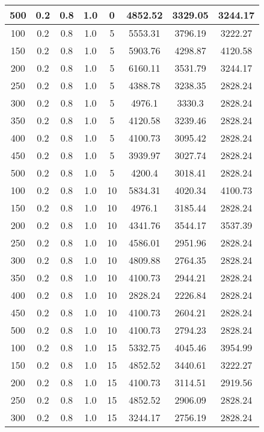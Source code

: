\documentclass[a4paper, 12pt]{extreport}
\begin{document}
\begin{itemize}
\begin{longtable}{|c|c|c|c|c|c|c|c|}
			500 & 0.2 & 0.8 & 1.0 & 0 & 4852.52 & 3329.05 & 3244.17 \\\hline
			100 & 0.2 & 0.8 & 1.0 & 5 & 5553.31 & 3796.19 & 3222.27 \\\hline
			150 & 0.2 & 0.8 & 1.0 & 5 & 5903.76 & 4298.87 & 4120.58 \\\hline
			200 & 0.2 & 0.8 & 1.0 & 5 & 6160.11 & 3531.79 & 3244.17 \\\hline
			250 & 0.2 & 0.8 & 1.0 & 5 & 4388.78 & 3238.35 & 2828.24 \\\hline
			300 & 0.2 & 0.8 & 1.0 & 5 & 4976.1 & 3330.3 & 2828.24 \\\hline
			350 & 0.2 & 0.8 & 1.0 & 5 & 4120.58 & 3239.46 & 2828.24 \\\hline
			400 & 0.2 & 0.8 & 1.0 & 5 & 4100.73 & 3095.42 & 2828.24 \\\hline
			450 & 0.2 & 0.8 & 1.0 & 5 & 3939.97 & 3027.74 & 2828.24 \\\hline
			500 & 0.2 & 0.8 & 1.0 & 5 & 4200.4 & 3018.41 & 2828.24 \\\hline
			100 & 0.2 & 0.8 & 1.0 & 10 & 5834.31 & 4020.34 & 4100.73 \\\hline
			150 & 0.2 & 0.8 & 1.0 & 10 & 4976.1 & 3185.44 & 2828.24 \\\hline
			200 & 0.2 & 0.8 & 1.0 & 10 & 4341.76 & 3544.17 & 3537.39 \\\hline
			250 & 0.2 & 0.8 & 1.0 & 10 & 4586.01 & 2951.96 & 2828.24 \\\hline
			300 & 0.2 & 0.8 & 1.0 & 10 & 4809.88 & 2764.35 & 2828.24 \\\hline
			350 & 0.2 & 0.8 & 1.0 & 10 & 4100.73 & 2944.21 & 2828.24 \\\hline
			400 & 0.2 & 0.8 & 1.0 & 10 & 2828.24 & 2226.84 & 2828.24 \\\hline
			450 & 0.2 & 0.8 & 1.0 & 10 & 4100.73 & 2604.21 & 2828.24 \\\hline
			500 & 0.2 & 0.8 & 1.0 & 10 & 4100.73 & 2794.23 & 2828.24 \\\hline
			100 & 0.2 & 0.8 & 1.0 & 15 & 5332.75 & 4045.46 & 3954.99 \\\hline
			150 & 0.2 & 0.8 & 1.0 & 15 & 4852.52 & 3440.61 & 3222.27 \\\hline
			200 & 0.2 & 0.8 & 1.0 & 15 & 4100.73 & 3114.51 & 2919.56 \\\hline
			250 & 0.2 & 0.8 & 1.0 & 15 & 4852.52 & 2906.09 & 2828.24 \\\hline
			300 & 0.2 & 0.8 & 1.0 & 15 & 3244.17 & 2756.19 & 2828.24 \\\hline

\end{longtable}
\end{itemize}
\end{document}
